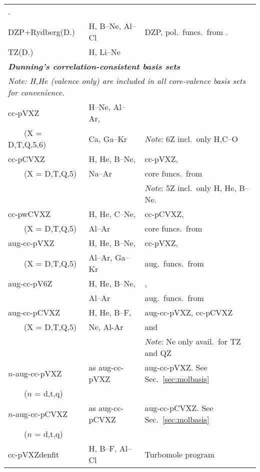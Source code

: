 \begin{longtable}{lll}
  \cite{thdpjhhfs1977-2}.\\
DZP+Rydberg(D.) & H, B--Ne, Al--Cl & DZP, pol.\ funcs.\ from 
  \cite{thdpjhhfs1977-2}.\\
TZ(D.) & H, Li--Ne & \cite{thdjcp55}\\
\hline
\multicolumn{3}{l}{\bf{\emph{Dunning's correlation-consistent basis 
sets\index{basis set!correlation-consistent}\index{correlation-consistent basis set}}}} \\
\multicolumn{3}{l}{\emph{Note: H,He (valence only) are included in all core-valence basis sets 
  for convenience.}} \\
cc-pVXZ & H--Ne, Al--Ar, & \cite{thdjcp90,dewthdjcp100,dewthdjcp98,
  jkkapjpca106,akwdewkapthdjcp110} \\
 ~~~~(X = D,T,Q,5,6) & Ca, Ga--Kr & \emph{Note}: 6Z incl.\ only H,C--O\\
cc-pCVXZ & H, He, B--Ne, & cc-pVXZ,  \\
 ~~~~(X = D,T,Q,5) & Na--Ar & core funcs.\ from
   \cite{thdjcp90,jkkapjpca106,dewthdjcp103} \\
 				   & & \emph{Note}: 5Z incl.\ only H, He, B--Ne. \\
cc-pwCVXZ & H, He, C--Ne,  & cc-pCVXZ, \\
 ~~~~(X = D,T,Q,5) & Al--Ar &  core funcs.\ from \cite{thdjcp90,kapthdjcp117} \\
aug-cc-pVXZ & H, He, B--Ne, & cc-pVXZ,\\
 ~~~~(X = D,T,Q,5) & Al--Ar, Ga--Kr &  aug.\ funcs.\ from 
   \cite{thdjcp90,rakthdrjhjcp96,dewthdjcp98,dewthdjcp100} \\
aug-cc-pV6Z & H, He, B--Ne, & \cite{akwtvmthdjsm388,tmakwtdhmp96}, \\
  & Al--Ar & aug.\ funcs.\ from 
    \cite{akwtvmthdjsm388,tmakwtdhmp96,tmthdijqc76} \\
aug-cc-pCVXZ & H, He, B--F, & aug-cc-pVXZ, cc-pCVXZ \\
 ~~~~(X = D,T,Q,5) & Ne, Al-Ar &  and \cite{dewthdjcp103,kapthdjcp117}\\
                   & & \emph{Note}: Ne only avail.\ for TZ and QZ \\
$n$-aug-cc-pVXZ & as aug-cc-pVXZ & aug-cc-pVXZ. See Sec.~\ref{sec:molbasis} \\
 ~~~~($n$ = d,t,q) & & \\
$n$-aug-cc-pCVXZ & as aug-cc-pCVXZ & aug-cc-pCVXZ. See Sec.~\ref{sec:molbasis} \\
 ~~~~($n$ = d,t,q) & & \\
cc-pVXZdenfit & H, B--F, Al--Cl & Turbomole program \\

\end{longtable}
